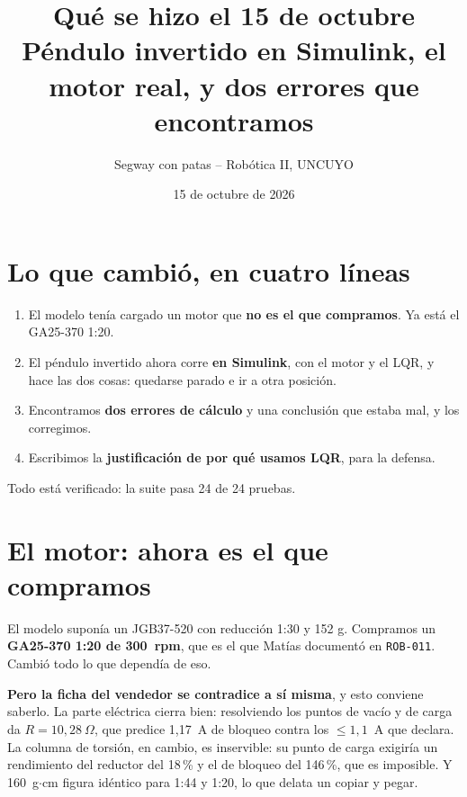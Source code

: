 \documentclass[11pt,a4paper]{article}
\title{Qué se hizo el 15 de octubre\\[4pt]
\large Péndulo invertido en Simulink, el motor real, y dos errores que encontramos}
\author{Segway con patas -- Robótica II, UNCUYO}
\date{15 de octubre de 2026}
\begin{document}
\maketitle

\noindent{}

\section{Lo que cambió, en cuatro líneas}

\begin{enumerate}[nosep]
\item El modelo tenía cargado un motor que \textbf{no es el que compramos}. Ya está el GA25-370 1:20.
\item El péndulo invertido ahora corre \textbf{en Simulink}, con el motor y el LQR, y hace las dos
  cosas: quedarse parado e ir a otra posición.
\item Encontramos \textbf{dos errores de cálculo} y una conclusión que estaba mal, y los corregimos.
\item Escribimos la \textbf{justificación de por qué usamos LQR}, para la defensa.
\end{enumerate}

Todo está verificado: la suite pasa 24 de 24 pruebas.

\section{El motor: ahora es el que compramos}

El modelo suponía un JGB37-520 con reducción 1:30 y 152 g. Compramos un \textbf{GA25-370 1:20 de
300~rpm}, que es el que Matías documentó en \texttt{ROB-011}. Cambió todo lo que dependía de eso.

\textbf{Pero la ficha del vendedor se contradice a sí misma}, y esto conviene saberlo. La parte
eléctrica cierra bien: resolviendo los puntos de vacío y de carga da $R = 10{,}28~\Omega$, que predice
1,17~A de bloqueo contra los $\le 1{,}1$~A que declara. La columna de torsión, en cambio, es
inservible: su punto de carga exigiría un rendimiento del reductor del 18\,\% y el de bloqueo del
146\,\%, que es imposible. Y 160~g$\cdot$cm figura idéntico para 1:44 y 1:20, lo que delata un copiar
y pegar.
\end{document}
